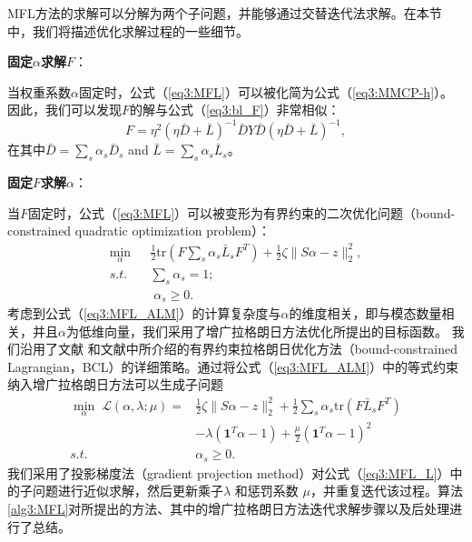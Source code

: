MFL方法的求解可以分解为两个子问题，并能够通过交替迭代法求解。在本节中，我们将描述优化求解过程的一些细节。

    \textbf{固定$\alpha$求解$F$}：

当权重系数$\alpha$固定时，公式（\ref{eq3:MFL}）可以被化简为公式（\ref{eq3:MMCP-h}）。因此，我们可以发现$F$的解与公式（\ref{eq3:bl_F}）非常相似：
\begin{equation}
{F} = \eta^2(\eta\bar{{D}}+\bar{{L}})^{-1}\bar{{D}} {Y}\bar{{D}}(\eta\bar{{D}}+\bar{{L}})^{-1},
\label{eq3:MFL_F}
\end{equation}
在其中$  \bar{{D}} = \sum_s \alpha_s  \bar{{D}}_s $ and $  \bar{{L}} = \sum_s \alpha_s \bar{{L}}_s $。

    \textbf{固定$F$求解$\alpha$}：

当$F$固定时，公式（\ref{eq3:MFL}）可以被变形为有界约束的二次优化问题（bound-constrained quadratic optimization problem）：
\begin{equation}
\begin{split}
\mathop{\mathrm{min}}_{{\alpha}}\;&\frac{1}{2}\mathrm{tr}({F} \sum_s\alpha_s\bar{{L}}_s{F}^T)+\frac{1}{2}\zeta\|{S}{\alpha} - {z}  \|_2^2,\\
s.t.\quad& \sum_s \alpha_s = 1;\\ &\; \alpha_s \ge 0.
\end{split}
\label{eq3:MFL_ALM}
\end{equation}    
考虑到公式（\ref{eq3:MFL_ALM}）的计算复杂度与$\alpha$的维度相关，即与模态数量相关，并且$\alpha$为低维向量，我们采用了增广拉格朗日方法\cite{bertsekas1982constrained}优化所提出的目标函数。
我们沿用了文献\parencite{nocedal2006numerical} 和文献\parencite{bertsekas1982constrained}中所介绍的有界约束拉格朗日优化方法（bound-constrained Lagrangian，BCL）的详细策略。通过将公式（\ref{eq3:MFL_ALM}）中的等式约束纳入增广拉格朗日方法可以生成子问题
\begin{equation}
\begin{split}
\mathop{\mathrm{min}}_{{\alpha}}\;\mathcal{L}({\alpha},\lambda;\mu) =&\frac{1}{2}\zeta\|{S}{\alpha} - {z}\|_2^2+\frac{1}{2}\sum_s\alpha_s\mathrm{tr}({F} \bar{{L}}_s{F}^T) \\
&- \lambda(\mathbf{1}^T{\alpha}-1)+\frac{\mu}{2}(\mathbf{1}^T{\alpha}-1)^2\\
s.t.\quad &\alpha_s \ge 0.
\end{split}
\label{eq3:MFL_L}
\end{equation}
我们采用了投影梯度法（gradient projection method）对公式（\ref{eq3:MFL_L}）中的子问题进行近似求解，然后更新乘子$ \lambda $ 和惩罚系数 $ \mu $，并重复迭代该过程\cite{nocedal2006numerical,conn1992lancelot}。算法\ref{alg3:MFL}对所提出的方法、其中的增广拉格朗日方法迭代求解步骤以及后处理进行了总结。

